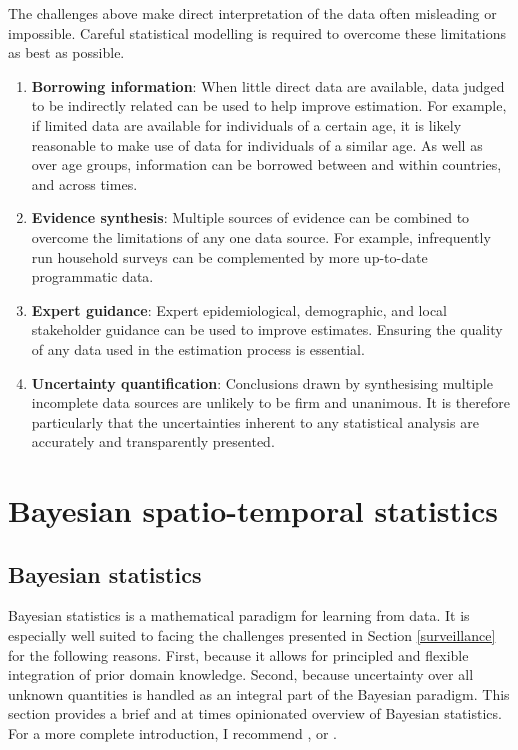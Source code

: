 \documentclass[a4paper, nobind]{templates/ociamthesis}
\begin{document}
The challenges above make direct interpretation of the data often misleading or impossible.
Careful statistical modelling is required to overcome these limitations as best as possible.

\begin{enumerate}
\def\labelenumi{\arabic{enumi}.}
\item
  \textbf{Borrowing information}:
  When little direct data are available, data judged to be indirectly related can be used to help improve estimation.
  For example, if limited data are available for individuals of a certain age, it is likely reasonable to make use of data for individuals of a similar age.
  As well as over age groups, information can be borrowed between and within countries, and across times.
\item
  \textbf{Evidence synthesis}:
  Multiple sources of evidence can be combined to overcome the limitations of any one data source.
  For example, infrequently run household surveys can be complemented by more up-to-date programmatic data.
\item
  \textbf{Expert guidance}:
  Expert epidemiological, demographic, and local stakeholder guidance can be used to improve estimates.
  Ensuring the quality of any data used in the estimation process is essential.
\item
  \textbf{Uncertainty quantification}:
  Conclusions drawn by synthesising multiple incomplete data sources are unlikely to be firm and unanimous.
  It is therefore particularly that the uncertainties inherent to any statistical analysis are accurately and transparently presented.
\end{enumerate}

\hypertarget{bayes-st}{%
\chapter{Bayesian spatio-temporal statistics}\label{bayes-st}}

\adjustmtc
{}

\hypertarget{bayesian-statistics}{%
\section{Bayesian statistics}\label{bayesian-statistics}}

Bayesian statistics is a mathematical paradigm for learning from data.
It is especially well suited to facing the challenges presented in Section \ref{surveillance} for the following reasons.
First, because it allows for principled and flexible integration of prior domain knowledge.
Second, because uncertainty over all unknown quantities is handled as an integral part of the Bayesian paradigm.
This section provides a brief and at times opinionated overview of Bayesian statistics.
For a more complete introduction, I recommend \textcite{gelman2013bayesian}, \textcite{mcelreath2020statistical} or \textcite{gelman2020bayesian}.
\end{document}
